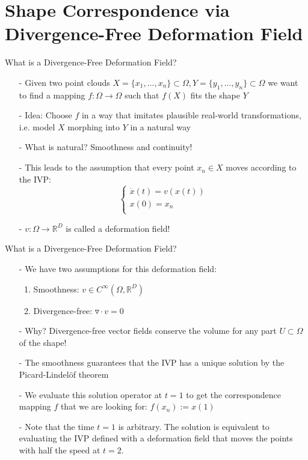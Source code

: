 \documentclass[xcolor=dvipsnames]{beamer}
\begin{document}
\section{Shape Correspondence via Divergence-Free Deformation Field}
\begin{frame}{What is a Divergence-Free Deformation Field?}
\begin{enumerate}
\item[-]Given two point clouds $X=\{x_1,...,x_n\} \subset \Omega, Y=\{y_1,...,y_n\}\subset \Omega$ we want to find a mapping $f: \Omega \rightarrow \Omega$ such that $f(X)$ fits the shape $Y$
\item[-]Idea: Choose $f$ in a way that imitates plausible real-world transformations, i.e. model $X$ morphing into $Y$ in a natural way
\item[-] What is natural? Smoothness and continuity!
\item[-] This leads to the assumption that every point $x_n \in X$ moves according to the IVP: \begin{equation*}
  	\begin{cases}
    \dot{x}(t) = v(x(t)) \\
    x(0) = x_n \\
    \end{cases}
    \end{equation*}
\item[-] $v: \Omega \rightarrow \mathbb{R}^D$ is called a deformation field!
\end{enumerate}
\end{frame}
\begin{frame}{What is a Divergence-Free Deformation Field?}
\begin{enumerate}
\item[-]We have two assumptions for this deformation field:
\begin{enumerate}
	\item Smoothness: $v \in C^\infty(\Omega, \mathbb{R}^D)$
	\item Divergence-free: $\triangledown\cdot v = 0 $
\end{enumerate}
\item[-]Why? Divergence-free vector fields conserve the volume for any part $U \subset \Omega$ of the shape!
\item[-]The smoothness guarantees that the IVP has a unique solution by the Picard-Lindelöf theorem
\item[-] We evaluate this solution operator at $t=1$ to get the correspondence mapping $f$ that we are looking for: $f(x_n) := x(1)$
\item[-] Note that the time $t=1$ is arbitrary. The solution is equivalent to evaluating the IVP defined with a deformation field that moves the points with half the speed at $t=2$.
\end{enumerate}
\end{frame}
\end{document}
